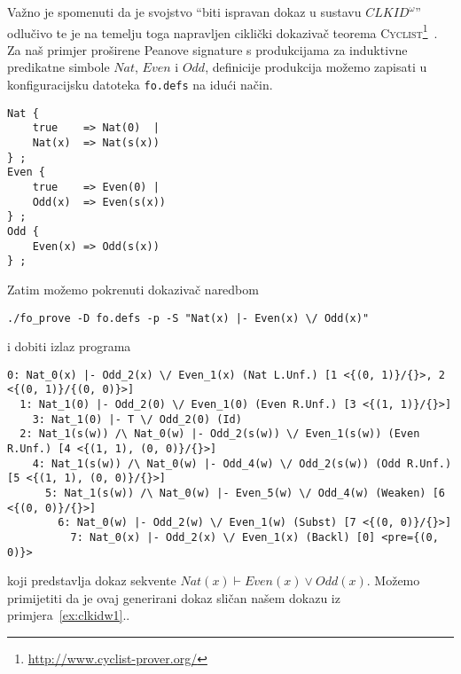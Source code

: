 Važno je spomenuti da je svojstvo \enquote{biti ispravan dokaz u sustavu \(\mathit{CLKID}^{\omega}\)} odlučivo
te je na temelju toga napravljen ciklički dokazivač teorema \textsc{Cyclist}\footnote{\url{http://www.cyclist-prover.org/}}~\cite{cyclist}.
Za naš primjer proširene Peanove signature s produkcijama za induktivne predikatne simbole
\(\mathit{Nat}\), \(\mathit{Even}\) i \(\mathit{Odd}\),
definicije produkcija možemo zapisati u konfiguracijsku datoteka \texttt{fo.defs}
na idući način.\par
\begin{footnotesize}
  \begin{verbatim}
Nat { 
    true    => Nat(0)  | 
    Nat(x)  => Nat(s(x)) 
} ;
Even {
    true    => Even(0) |
    Odd(x)  => Even(s(x))
} ;
Odd {
    Even(x) => Odd(s(x))
} ;
\end{verbatim}
\end{footnotesize}
Zatim možemo pokrenuti dokazivač naredbom
\begin{verbatim}
./fo_prove -D fo.defs -p -S "Nat(x) |- Even(x) \/ Odd(x)"
\end{verbatim}
i dobiti izlaz programa
\begin{scriptsize}
\begin{verbatim}
0: Nat_0(x) |- Odd_2(x) \/ Even_1(x) (Nat L.Unf.) [1 <{(0, 1)}/{}>, 2 <{(0, 1)}/{(0, 0)}>]
  1: Nat_1(0) |- Odd_2(0) \/ Even_1(0) (Even R.Unf.) [3 <{(1, 1)}/{}>]
    3: Nat_1(0) |- T \/ Odd_2(0) (Id)
  2: Nat_1(s(w)) /\ Nat_0(w) |- Odd_2(s(w)) \/ Even_1(s(w)) (Even R.Unf.) [4 <{(1, 1), (0, 0)}/{}>]
    4: Nat_1(s(w)) /\ Nat_0(w) |- Odd_4(w) \/ Odd_2(s(w)) (Odd R.Unf.) [5 <{(1, 1), (0, 0)}/{}>]
      5: Nat_1(s(w)) /\ Nat_0(w) |- Even_5(w) \/ Odd_4(w) (Weaken) [6 <{(0, 0)}/{}>]
        6: Nat_0(w) |- Odd_2(w) \/ Even_1(w) (Subst) [7 <{(0, 0)}/{}>]
          7: Nat_0(x) |- Odd_2(x) \/ Even_1(x) (Backl) [0] <pre={(0, 0)}>
\end{verbatim}
\end{scriptsize}
koji predstavlja dokaz sekvente \(\mathit{Nat}(x) \vdash \mathit{Even}(x) \lor \mathit{Odd}(x)\).
Možemo primijetiti da je ovaj generirani dokaz sličan našem dokazu iz primjera~\ref{ex:clkidw1}..

